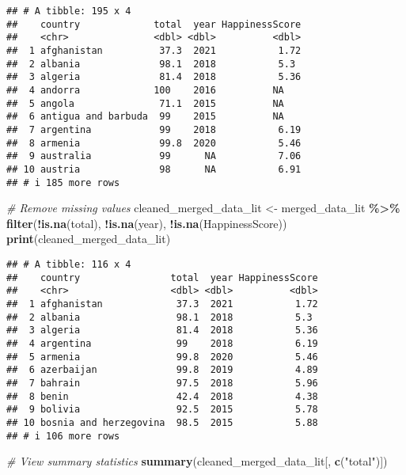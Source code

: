 \documentclass[
]{article}
\newenvironment{Shaded}{\begin{snugshade}}{\end{snugshade}}
\newcommand{\CommentTok}[1]{\textcolor[rgb]{0.56,0.35,0.01}{\textit{#1}}}
\newcommand{\FunctionTok}[1]{\textcolor[rgb]{0.13,0.29,0.53}{\textbf{#1}}}
\newcommand{\NormalTok}[1]{#1}
\newcommand{\OtherTok}[1]{\textcolor[rgb]{0.56,0.35,0.01}{#1}}
\newcommand{\SpecialCharTok}[1]{\textcolor[rgb]{0.81,0.36,0.00}{\textbf{#1}}}
\newcommand{\StringTok}[1]{\textcolor[rgb]{0.31,0.60,0.02}{#1}}
\begin{document}
\begin{verbatim}
## # A tibble: 195 x 4
##    country             total  year HappinessScore
##    <chr>               <dbl> <dbl>          <dbl>
##  1 afghanistan          37.3  2021           1.72
##  2 albania              98.1  2018           5.3 
##  3 algeria              81.4  2018           5.36
##  4 andorra             100    2016          NA   
##  5 angola               71.1  2015          NA   
##  6 antigua and barbuda  99    2015          NA   
##  7 argentina            99    2018           6.19
##  8 armenia              99.8  2020           5.46
##  9 australia            99      NA           7.06
## 10 austria              98      NA           6.91
## # i 185 more rows
\end{verbatim}

\begin{Shaded}
\begin{Highlighting}[]
\CommentTok{\# Remove missing values}
\NormalTok{cleaned\_merged\_data\_lit }\OtherTok{\textless{}{-}}\NormalTok{ merged\_data\_lit }\SpecialCharTok{\%\textgreater{}\%}
  \FunctionTok{filter}\NormalTok{(}\SpecialCharTok{!}\FunctionTok{is.na}\NormalTok{(total), }\SpecialCharTok{!}\FunctionTok{is.na}\NormalTok{(year), }\SpecialCharTok{!}\FunctionTok{is.na}\NormalTok{(HappinessScore))}
\FunctionTok{print}\NormalTok{(cleaned\_merged\_data\_lit)}
\end{Highlighting}
\end{Shaded}

\begin{verbatim}
## # A tibble: 116 x 4
##    country                total  year HappinessScore
##    <chr>                  <dbl> <dbl>          <dbl>
##  1 afghanistan             37.3  2021           1.72
##  2 albania                 98.1  2018           5.3 
##  3 algeria                 81.4  2018           5.36
##  4 argentina               99    2018           6.19
##  5 armenia                 99.8  2020           5.46
##  6 azerbaijan              99.8  2019           4.89
##  7 bahrain                 97.5  2018           5.96
##  8 benin                   42.4  2018           4.38
##  9 bolivia                 92.5  2015           5.78
## 10 bosnia and herzegovina  98.5  2015           5.88
## # i 106 more rows
\end{verbatim}

\begin{Shaded}
\begin{Highlighting}[]
\CommentTok{\# View summary statistics }
\FunctionTok{summary}\NormalTok{(cleaned\_merged\_data\_lit[, }\FunctionTok{c}\NormalTok{(}\StringTok{"total"}\NormalTok{)])}
\end{Highlighting}
\end{Shaded}
\end{document}
